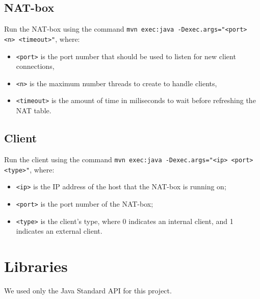 \documentclass[10pt, a4paper]{article}
\begin{document}
\subsection{NAT-box}
\label{ssec:execnat}

Run the NAT-box using the command \texttt{mvn exec:java -Dexec.args="<port> <n>
<timeout>"}, where:
\begin{itemize}
  \item \texttt{<port>} is the port number that should be used to listen for new
    client connections,
  \item \texttt{<n>} is the maximum number threads to create to handle clients,
  \item \texttt{<timeout>} is the amount of time in miliseconds to wait before
    refreshing the NAT table.
\end{itemize}


\subsection{Client}
\label{ssec:execcli}

Run the client using the command \texttt{mvn exec:java -Dexec.args="<ip> <port>
<type>"}, where:
\begin{itemize}
  \item \texttt{<ip>} is the IP address of the host that the NAT-box is running
    on;
  \item \texttt{<port>} is the port number of the NAT-box;
  \item \texttt{<type>} is the client's type, where 0 indicates an internal
    client, and 1 indicates an external client.
\end{itemize}



\section{Libraries}
\label{sec:libs}

We used only the Java Standard API for this project.
\end{document}
